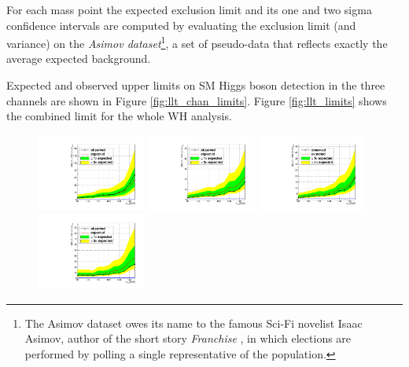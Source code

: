 For each mass point the expected exclusion limit and its one and two sigma confidence intervals are computed  by evaluating the exclusion limit (and variance) on the \emph{Asimov dataset}\footnote{The Asimov dataset owes its name to the famous Sci-Fi novelist Isaac Asimov, author of the short story \emph{Franchise} \cite{franchise}, in which elections are performed by polling a single representative of the population.}, a set of pseudo-data that reflects exactly the average expected background. 

Expected and observed upper limits on SM Higgs boson detection in the three channels are shown in Figure \ref{fig:llt_chan_limits}. Figure \ref{fig:llt_limits} shows the combined limit for the whole WH analysis.

\begin{figure}
\begin{center}
  \includegraphics[width=0.32\textwidth]{4_Analisys/pics/limits/mmt/mmt_7TeV.pdf}
  \includegraphics[width=0.32\textwidth]{4_Analisys/pics/limits/mmt/mmt_8TeV.pdf}
  \includegraphics[width=0.32\textwidth]{4_Analisys/pics/limits/mmt/mmt.pdf} \\
  \includegraphics[width=0.32\textwidth]{4_Analisys/pics/limits/emt/emt_7TeV.pdf}

\end{center}
\end{figure}
